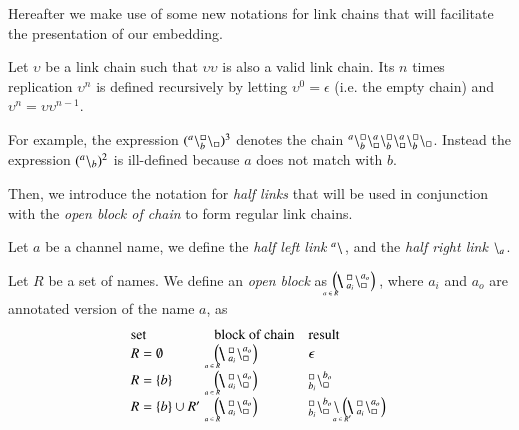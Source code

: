 Hereafter we make use of some new notations for link chains that will facilitate  
the presentation of our 
{\color{red} embedding.}

\begin{definition}[Replication]
Let $\upsilon$ be a link chain such that $\upsilon\upsilon$ is also a valid link chain. Its $n$ times replication $\upsilon^n$ is defined recursively by letting
$\upsilon^0 = \epsilon$ (i.e. the empty chain) and $\upsilon^n = \upsilon\upsilon^{n-1}$.
\end{definition}

For example,  the expression $({}^{a}\backslash_{b}^{\scriptstyle {\square}}\backslash_{\scriptstyle {\square}})^3$  denotes the chain ${}^{a}\backslash_{b}^{\scriptstyle {\square}}\backslash_{\scriptstyle {\square}}^{a}\backslash_{b}^{\scriptstyle {\square}}\backslash_{\scriptstyle {\square}}^{a}\backslash_{b}^{\scriptstyle {\square}}\backslash_{\scriptstyle {\square}}$. 
Instead the expression $({}^{a} \backslash_{b})^2$ is ill-defined because $a$ does not match with $b$.

Then, we introduce the notation for \emph{half links} that will be used in conjunction with the \emph{open block of chain} to form regular link chains.

\begin{definition}
Let $a$ be a channel name, we define the \emph{half left link}  ${}^{a} \backslash_{}$,   and the  \emph{half right link} ${}^{} \backslash_{a}$.
\end{definition}

\begin{definition}
Let $R$ be a set of names. We 
define an \emph{open block} as $\blockchain{a_i}{a_o}{a \in R}$, where $a_i$ and $a_o$ are annotated version of the name $a$, as
\[
\begin{array}{l@{\quad}l@{\quad}l}
\mbox{set}& \mbox{block of chain}& \mbox{result}\\
R= \emptyset & \blockchain{a_i}{a_o}{a \in R}   &\epsilon\\
R = \{ b\}    &\blockchain{a_i}{a_o}{a \in R}  & {}_{b_i}^{\noact}\chainedlink{\noact}{b_o}\\
R = \{b\} \cup R' & \blockchain{a_i}{a_o}{a \in R} & {}_{b_i}^{\noact}\chainedlink{\noact}{b_o}\link{}{}\blockchain{a_i}{a_o}{a \in R'}
\end{array}
\]
\end{definition}

